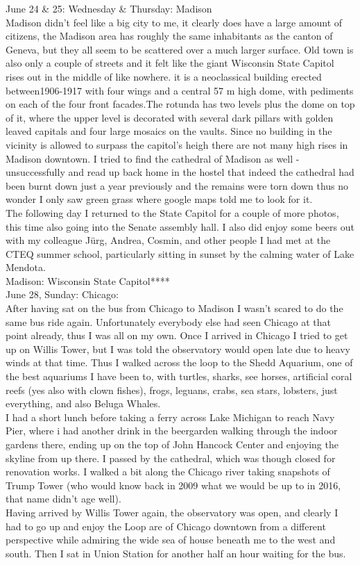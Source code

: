 June 24 \& 25: Wednesday \& Thursday: Madison\\
Madison didn't feel like a big city to me, it clearly does have a large amount of citizens, the Madison area has roughly the same inhabitants as the canton of Geneva, but they all seem to be scattered over a much larger surface. Old town is also only a couple of streets and it felt like the giant Wisconsin State Capitol rises out in the middle of like nowhere. it is a neoclassical building erected between1906-1917 with four wings and a central 57 m high dome, with pediments on each of the four front facades.The rotunda has two levels plus the dome on top of it, where the upper level is decorated with several dark pillars with golden leaved capitals and four large mosaics on the vaults. Since no building in the vicinity is allowed to surpass the capitol's heigh there are not many high rises in Madison downtown. I tried to find the cathedral of Madison as well - unsuccessfully and read up back home in the hostel that indeed the cathedral had been burnt down just a year previously and the remains were torn down thus no wonder I only saw green grass where google maps told me to look for it.\\
The following day I returned to the State Capitol for a couple of more photos, this time also going into the Senate assembly hall. I also did enjoy some beers out with my colleague J\"urg, Andrea, Cosmin, and other people I had met at the CTEQ summer school, particularly sitting in sunset by the calming water of Lake Mendota.\\

Madison: Wisconsin State Capitol****\\

June 28, Sunday: Chicago:\\
After having sat on the bus from Chicago to Madison I wasn't scared to do the same bus ride again. Unfortunately everybody else had seen Chicago at that point already, thus I was all on my own. Once I arrived in Chicago I tried to get up on Willis Tower, but I was told the observatory would open late due to heavy winds at that time. Thus I walked across the loop to the Shedd Aquarium, one of the best aquariums I have been to, with turtles, sharks, see horses, artificial coral reefs (yes also with clown fishes), frogs, leguans, crabs, sea stars, lobsters, just everything, and also Beluga Whales.\\
I had a short lunch before taking a ferry across Lake Michigan to reach Navy Pier, where i had another drink in the beergarden walking through the indoor gardens there, ending up on the top of John Hancock Center and enjoying the skyline from up there. I passed by the cathedral, which was though closed for renovation works. I walked a bit along the Chicago river taking snapshots of Trump Tower (who would know back in 2009 what we would be up to in 2016, that name didn't age well).\\
Having arrived by Willis Tower again, the observatory was open, and clearly I had to go up and enjoy the Loop are of Chicago downtown from a different perspective while admiring the wide sea of house beneath me to the west and south. Then I sat in Union Station for another half an hour waiting for the bus.\\

